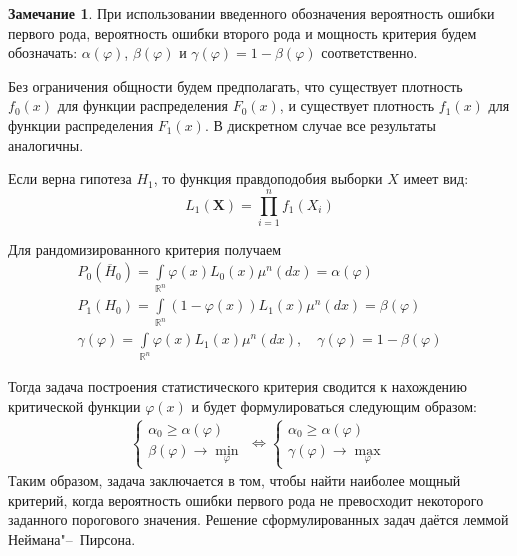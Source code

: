 \documentclass[oneside,final,14pt]{extreport}
\theoremstyle{plain}
\theoremstyle{definition}
\newtheorem*{rmrk}{Замечание}
\theoremstyle{named}
\begin{document}
\begin{rmrk}
При использовании введенного обозначения вероятность ошибки первого рода, вероятность ошибки второго рода и мощность критерия будем обозначать: $\alpha(\varphi)$, $\beta(\varphi)$ и $\gamma(\varphi)=1-\beta(\varphi)$ соответственно.
\end{rmrk}

Без ограничения общности будем предполагать, что существует плотность $f_{0}(x)$ для функции распределения $F_{0}(x)$, и существует плотность $f_{1}(x)$ для функции распределения $F_{1}(x)$. В дискретном случае все результаты аналогичны.

Если верна гипотеза $H_1$, то функция правдоподобия выборки $X$ имеет вид:
\begin{equation*}
    L_{1}\left(\mathbf{X}\right)=\prod_{i=1}^{n} f_{1}\left(X_{i}\right)
\end{equation*}

Для рандомизированного критерия получаем
\begin{gather*}
    P_{0}\left(\overline{H}_{0}\right)=\int\limits_{\mathbb{R}^{n}} \varphi(x) L_{0}(x) \mu^{n}(d x)=\alpha(\varphi) \\
    P_{1}\left(H_{0}\right)=\int\limits_{\mathbb{R}^{n}}(1-\varphi(x)) L_{1}(x) \mu^{n}(d x)=\beta(\varphi) \\
    \gamma(\varphi)=\int\limits_{\mathbb{R}^{n}} \varphi(x) L_{1}(x) \mu^{n}(d x), \quad \gamma(\varphi)=1-\beta(\varphi)
\end{gather*}

Тогда задача построения статистического критерия сводится к нахождению критической функции $\varphi(x)$ и будет формулироваться следующим образом:
\begin{equation*}
    \begin{array}{l}
    \left\{\begin{array}{l}
    \alpha_{0} \geqslant \alpha(\varphi) \\
    \beta(\varphi) \rightarrow \min\limits_{\varphi}
    \end{array}\right.
    \Leftrightarrow
    \left\{\begin{array}{l}
    \alpha_{0} \geqslant \alpha(\varphi) \\
    \gamma(\varphi) \rightarrow \max\limits_{\varphi}
    \end{array}\right.
    \end{array}
\end{equation*}
Таким образом, задача заключается в том, чтобы найти наиболее мощный критерий, когда вероятность ошибки первого рода не превосходит некоторого заданного порогового значения. Решение сформулированных задач даётся леммой Неймана"--~Пирсона.
\end{document}
